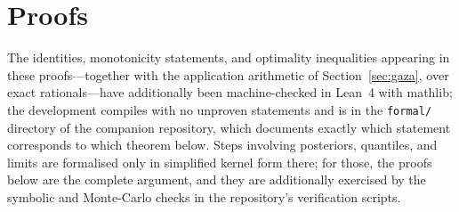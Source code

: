 \appendix

\section{Proofs}\label{app:proofs}

The identities, monotonicity statements, and optimality inequalities appearing in these proofs---together with the application arithmetic of Section~\ref{sec:gaza}, over exact rationals---have additionally been machine-checked in Lean~4 with mathlib; the development compiles with no unproven statements and is in the \texttt{formal/} directory of the companion repository, which documents exactly which statement corresponds to which theorem below. Steps involving posteriors, quantiles, and limits are formalised only in simplified kernel form there; for those, the proofs below are the complete argument, and they are additionally exercised by the symbolic and Monte-Carlo checks in the repository's verification scripts.

